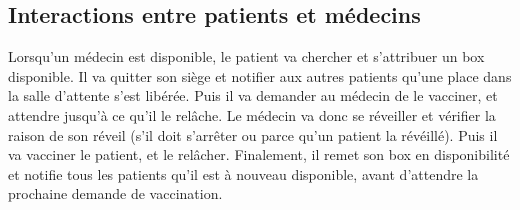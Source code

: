 \documentclass[a4paper]{article}
\begin{document}
  \subsection{Interactions entre patients et médecins}


  Lorsqu'un médecin est disponible, le patient va chercher et s'attribuer un box disponible. Il va quitter son siège et notifier aux autres patients qu'une place dans la salle d'attente s'est libérée. Puis il va demander au médecin de le vacciner, et attendre jusqu'à ce qu'il le relâche. Le médecin va donc se réveiller et vérifier la raison de son réveil (s'il doit s'arrêter ou parce qu'un patient la révéillé). Puis il va vacciner le patient, et le relâcher. Finalement, il remet son box en disponibilité et notifie tous les patients qu'il est à nouveau disponible, avant d'attendre la prochaine demande de vaccination.
\end{document}
